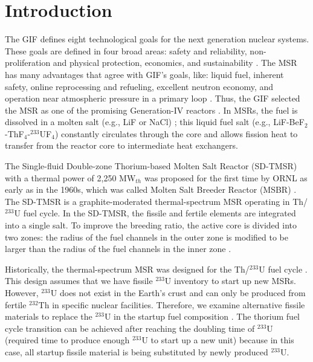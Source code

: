 \section{Introduction} \label{Introduction}
The \gls{GIF} defines eight technological goals for the next generation
nuclear systems. These goals are defined in four broad areas: safety and reliability, non-proliferation and physical protection, economics, and sustainability \cite{doe2002technology}. The \gls{MSR} has many advantages that agree
with \gls{GIF}'s goals, like: liquid fuel, inherent safety, online
reprocessing and refueling, excellent neutron economy, and operation near
atmospheric
pressure in a primary loop \cite{siemer2015molten,rosenthal1970molten}.
Thus, the \gls{GIF} selected the \gls{MSR} as one of the promising Generation-IV
reactors \cite{doe2002technology,pioro2016handbook}.
In \glspl{MSR}, the fuel is dissolved in a molten salt (e.g., LiF or NaCl) \cite{betzler_impacts_2019};
this liquid fuel salt (e.g., LiF-BeF$_2$-ThF$_4$-$^{233}$UF$_4$) constantly
circulates through the core and allows fission heat to transfer from the reactor
core to intermediate heat exchangers.

The Single-fluid Double-zone Thorium-based Molten Salt Reactor (SD-TMSR) with 
a thermal power of 2,250 MW$_{th}$ was proposed for the first time by ORNL as 
early as in the 1960s, which was called Molten Salt Breeder Reactor (MSBR) 
\cite{robertson_conceptual_1971}.
The SD-TMSR is a graphite-moderated thermal-spectrum \gls{MSR} operating in Th/$^{233}$U
fuel cycle. In the SD-TMSR, the fissile and fertile elements are integrated
into a single salt. To improve the breeding ratio, the active core is divided into two zones:
the radius of the fuel channels in the outer zone is modified to be larger
than the radius of the fuel channels in the inner zone \cite{li_optimization_2018}.

Historically, the thermal-spectrum \gls{MSR} was designed for the Th/$^{233}$U
fuel cycle \cite{rykhlevskii2019modeling,nuttin2005potential,
	merle2004scenarios,rosenthal1970molten}. This design assumes that we have
fissile $^{233}$U inventory to start up new \glspl{MSR}. However, $^{233}$U does not
exist in the Earth's crust and can only be produced from fertile $^{232}$Th in 
specific nuclear facilities. Therefore, we examine alternative fissile
materials to replace the $^{233}$U in the startup fuel
composition \cite{betzler2016modeling,zou2018transition}. The thorium fuel
cycle transition can be achieved after reaching the doubling
time of $^{233}$U (required time to produce enough $^{233}$U to start up a new unit) because in this case, all startup fissile material
is being substituted by newly produced $^{233}$U.

